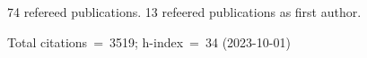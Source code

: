 74 refereed publications. 13 refeered publications as first author.

Total citations~=~3519; h-index~=~34 (2023-10-01)